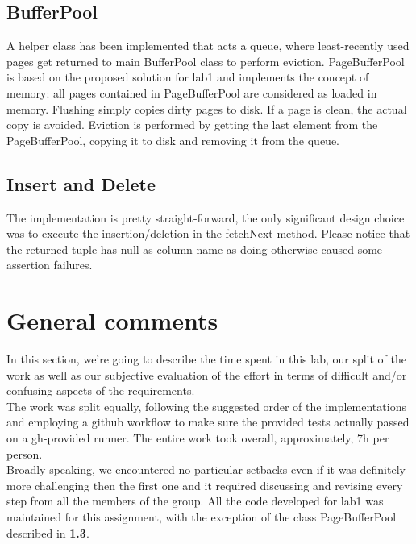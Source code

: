 \documentclass{article}
\begin{document}
\subsection{BufferPool}
A helper class has been implemented that acts a queue, where least-recently used pages get returned to main BufferPool class to perform eviction. PageBufferPool is based on the proposed solution for lab1 and implements the concept of memory: all pages contained in PageBufferPool are considered as loaded in memory. Flushing simply copies dirty pages to disk. If a page is clean, the actual copy is avoided. Eviction is performed by getting the last element from the PageBufferPool, copying it to disk and removing it from the queue.

\subsection{Insert and Delete}
The implementation is pretty straight-forward, the only significant design choice was to execute the insertion/deletion in the fetchNext method. Please notice that the returned tuple has null as column name as doing otherwise caused some assertion failures. 

\section{General comments}
In this section, we're going to describe the time spent in this lab, our split of the work as well as our subjective evaluation of the effort in terms of difficult and/or confusing aspects of the requirements.\\
The work was split equally, following the suggested order of the implementations and employing a github workflow to make sure the provided tests actually passed on a gh-provided runner. The entire work took overall, approximately, 7h per person. \\
Broadly speaking, we encountered no particular setbacks even if it was definitely more challenging then the first one and it required discussing and revising every step from all the members of the group. All the code developed for lab1 was maintained for this assignment, with the exception of the class PageBufferPool described in \textbf{1.3}.
\end{document}
